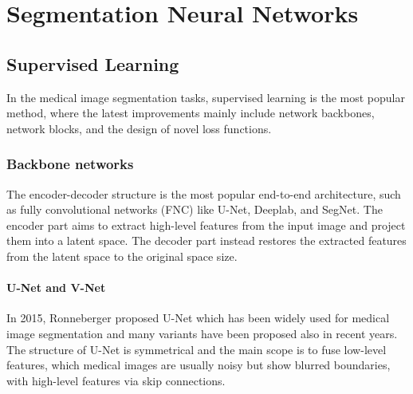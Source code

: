 
\chapter{Segmentation Neural Networks}

\label{chp:segmentation}

\def\:{\hskip0pt} %


\section{Supervised Learning}
In the medical image segmentation tasks, supervised learning is the most popular
method, where the latest improvements mainly include network backbones, network
blocks, and the design of novel loss functions.

\subsection{Backbone networks}
The encoder-decoder structure is the most popular end-to-end architecture, such
as fully convolutional networks (FNC) like U-Net, Deeplab, and SegNet. The
encoder part aims to extract high-level features from the input image and
project them into a latent space. The decoder part instead restores the
extracted features
from the latent space to the original space size.

\subsubsection{U-Net and V-Net}
In 2015, Ronneberger \etal \cite{ronneberger2015unet} proposed U-Net which has
been widely used for medical image segmentation and many variants have been
proposed also in recent years. The structure of U-Net is symmetrical and the
main scope is to fuse low-level features, which medical images are usually noisy
but show blurred boundaries, with high-level features via skip connections.

